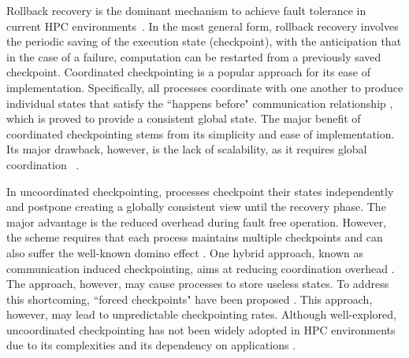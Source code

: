 Rollback recovery is the dominant mechanism to achieve fault
tolerance in current HPC environments~\cite{Deconinck93surveyof,Elnozahy:02:Survey,Egwutuoha2013}. In the most general form, rollback recovery 
involves the periodic saving of the execution state (checkpoint), with the anticipation that
in the case of a failure, computation can be restarted from a previously saved checkpoint. %
Coordinated checkpointing is a popular approach for
its ease of implementation.
Specifically, all processes
coordinate with one another to produce individual states that satisfy the ``happens before"
communication relationship \cite{chandy_trans_1972}, which is proved to provide a consistent global state.
The major benefit of coordinated checkpointing stems from its simplicity and ease of implementation. 
Its major drawback, however, is the lack of scalability, as it requires global coordination
~\cite{elnozahy_dsc_2004,riesen_sandia_2010}.


In uncoordinated checkpointing, processes checkpoint their states independently and postpone creating a 
globally consistent view until the recovery phase. The major advantage is the reduced overhead during fault free operation. However, the scheme requires that
each process maintains multiple checkpoints %
and can also suffer the well-known domino effect 
 \cite{randell_domino_effect,alvisi_ftc_1999,helary_rds_1997}. One hybrid approach, known as communication induced 
checkpointing, aims at reducing coordination overhead \cite{alvisi_ftc_1999}. The approach, however, may 
cause processes to store useless states. To address this 
shortcoming, ``forced checkpoints" have been proposed \cite{helary_rds_1997}. This approach, however,  may lead to unpredictable
checkpointing rates. 
Although well-explored, uncoordinated checkpointing has not been widely adopted
in HPC environments due to its complexities and its dependency on applications \cite{guermouche_2011_ipdps}.


